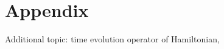 \documentclass[10pt]{book}
\begin{document}
\newpage
\part{Appendix}
\appendix








Additional topic: time evolution operator of Hamiltonian,


\printindex
\end{document}
